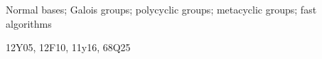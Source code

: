 \begin{keywords}
Normal bases; Galois groups; polycyclic groups; metacyclic groups; fast algorithms
\end{keywords}

\begin{subject}
12Y05, 12F10, 11y16, 68Q25
\end{subject}




\newcommand{\F}{{\mathsf{F}}}
\newcommand{\K}{{\mathsf{K}}}

\newcommand{\NN}{{\mathbb{N}}}
\newcommand{\N}{{\mathbb{N}}}

\def\A{\mathbb{A}}
\def\H{\mathbb{H}}
\def\B{\mathbb{B}}
\def\Z{\mathbb{Z}}
\def\C{\mathbb{C}}
\def\Q{\mathbb{Q}}
\def\D{\mathbb{D}}
\newcommand{\QQ}{\mathbb{Q}}
\newcommand{\mat}[1]{\mathbf{\MakeUppercase{#1}}} %

\newcommand{\osum}[2]{\alpha_{#1,#2}}
\newcommand{\osumcost}{O(n^{(3/4)\cdot \omega(4/3)})}
\newcommand{\osumcosttilde}{\tilde{O}(n^{(3/4)\cdot \omega(4/3)})}
\newcommand{\thecost}{\tilde{O}(n^{(3/4)\cdot \omega(4/3)})}

\newcommand{\FF}{{\mathbb{F}}}
\newcommand{\xbar}{\xi}
\newcommand{\zbar}{\zeta}
\newcommand{\alg}{quadratic\,}

\newcommand{\citeN}{\citet}






\noacknowledge%
                 









% 





